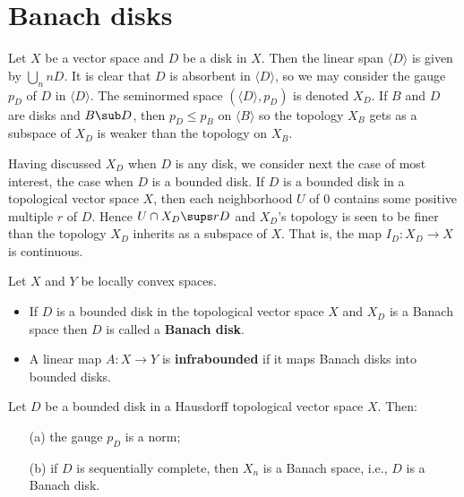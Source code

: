 \section{Banach disks}
Let $X$ be a vector space and $D$ be a disk in $X$. Then the linear span $\langle D\rangle$ is given by $\bigcup_nnD$. It is clear that $D$ is absorbent in $\langle D\rangle$, so we may consider the gauge $p_D$ of $D$ in $\langle D\rangle$. The seminormed space $(\langle D\rangle,p_D)$ is denoted $X_D$. If $B$ and $D$ are disks and $B\sub D$, then $p_D\leq p_B$ on $\langle B\rangle$ so the topology $X_B$ gets as a subspace of $X_D$ is weaker than the topology on $X_B$.\par
Having discussed $X_D$ when $D$ is any disk, we consider next the case of most interest, the case when $D$ is a bounded disk. If $D$ is a bounded disk in a topological vector space $X$, then each neighborhood $U$ of $0$ contains some positive multiple $r$ of $D$. Hence $U\cap X_D\sups rD$ and $X_D$'s topology is seen to be finer than the topology $X_D$ inherits as a subspace of $X$. That is, the map $I_D:X_D\to X$ is continuous.
\begin{definition}
Let $X$ and $Y$ be locally convex spaces.
\begin{itemize}
\item If $D$ is a bounded disk in the topological vector space $X$ and $X_D$ is a Banach space then $D$ is called a \textbf{Banach disk}.\par
\item A linear map $A:X\to Y$ is \textbf{infrabounded} if it maps Banach disks into bounded disks.
\end{itemize}
\end{definition}
\begin{proposition}\label{TVS Banach disk if}
Let $D$ be a bounded disk in a Hausdorff topological vector space $X$. Then:
\begin{itemize}
\item[(a)] the gauge $p_D$ is a norm;
\item[(b)] if $D$ is sequentially complete, then $X_n$ is a Banach space, i.e., $D$ is a Banach disk.
\end{itemize}
\end{proposition}
